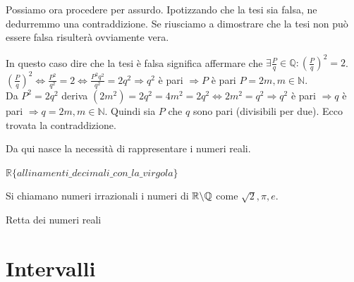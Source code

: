 \begin{dimostration}
Possiamo ora procedere per assurdo. Ipotizzando che la tesi sia falsa, ne dedurremmo una contraddizione. Se riusciamo a dimostrare che la tesi non può essere falsa risulterà ovviamente vera.

In questo caso dire che la tesi è falsa significa affermare che $\exists\frac{P}{q}\in\mathbb{Q}:(\frac{P}{q})^2=2$.\\$(\frac{P}{q})^2\Leftrightarrow\frac{P^2}{q^2}=2\Leftrightarrow\frac{P^2q^2}{q^2}=2q^2\Rightarrow q^2$ è pari $\Rightarrow P$ è pari $P=2m, m\in\mathbb{N}$.\\Da $P^2=2q^2$ deriva $(2m^2)=2q^2=4m^2=2q^2\Leftrightarrow2m^2=q^2\Rightarrow q^2$ è pari $\Rightarrow q$ è pari $\Rightarrow q=2m, m\in\mathbb{N}$. Quindi sia $P$ che $q$ sono pari (divisibili per due). Ecco trovata la contraddizione.\flushright{$\blacksquare$}
\end{dimostration}

Da qui nasce la necessità di rappresentare i numeri reali.
\begin{center}
    $\mathbb{R}\{allinamenti\_decimali\_con\_la\_virgola\}$
\end{center}

Si chiamano numeri irrazionali i numeri di $\mathbb{R}\symbol{92}\mathbb{Q}$ come $\sqrt{2}, \pi, e$.

\begin{center}
    \large{Retta dei numeri reali}
\end{center}
\begin{center}
\end{center}

\section{Intervalli}

